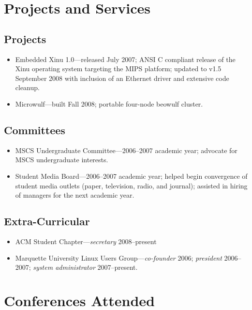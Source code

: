 \documentclass[12pt]{article}
\begin{document}
\section*{Projects and Services}

\subsection*{Projects}
\begin{itemize}
	\item Embedded Xinu 1.0---released July 2007; ANSI C compliant release
	of the Xinu operating system targeting the MIPS platform; updated to
	v1.5 September 2008 with inclusion of an Ethernet driver and extensive
	code cleanup.
	\item Microwulf---built Fall 2008; portable four-node beowulf cluster.
\end{itemize}

\subsection*{Committees}
\begin{itemize}
	\item MSCS Undergraduate Committee---2006--2007 academic year; advocate
	for MSCS undergraduate interests.
	\item Student Media Board---2006--2007 academic year; helped begin
	convergence of student media outlets (paper, television, radio, and
	journal); assisted in hiring of managers for the next academic year.
\end{itemize}

\subsection*{Extra-Curricular}
\begin{itemize}
	\item ACM Student Chapter---{\em secretary} 2008--present
	\item Marquette University Linux Users Group---{\em co-founder} 2006;
	{\em president} 2006--2007; {\em system administrator} 2007--present.
\end{itemize}

\section*{Conferences Attended}
\end{document}
